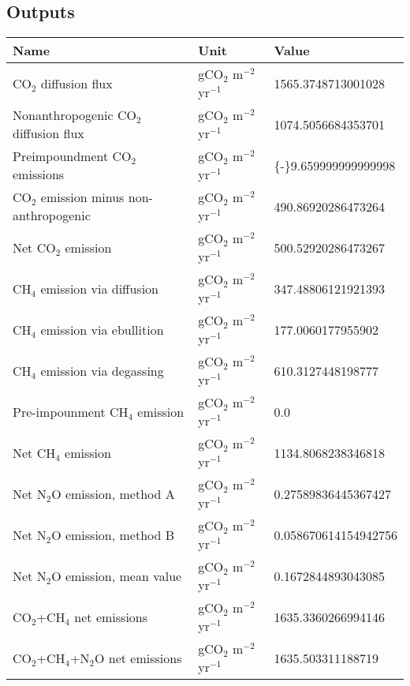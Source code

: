 \documentclass{article}%
\begin{document}
%
\subsection{Outputs}%
\label{subsec:Outputs}%
\begin{center}%
\renewcommand{\arraystretch}{1.0}%
\begin{tabu}{@{}p{10cm} X[c] X[l]@{}}%
\toprule%
\textbf{Name}&\textbf{Unit}&\textbf{Value}\\%
\midrule%
CO$_2$ diffusion flux&gCO$_2$ m$^{-2}$ yr$^{-1}$&\num[round-precision=4,round-mode=figures]{1565.3748713001028}\\%
Nonanthropogenic CO$_2$ diffusion flux&gCO$_2$ m$^{-2}$ yr$^{-1}$&\num[round-precision=4,round-mode=figures]{1074.5056684353701}\\%
Preimpoundment CO$_2$ emissions&gCO$_2$ m$^{-2}$ yr$^{-1}$&\num[round-precision=4,round-mode=figures]{{-}9.659999999999998}\\%
CO$_2$ emission minus non-anthropogenic&gCO$_2$ m$^{-2}$ yr$^{-1}$&\num[round-precision=4,round-mode=figures]{490.86920286473264}\\%
Net CO$_2$ emission&gCO$_2$ m$^{-2}$ yr$^{-1}$&\num[round-precision=4,round-mode=figures]{500.52920286473267}\\%
CH$_4$ emission via diffusion&gCO$_2$ m$^{-2}$ yr$^{-1}$&\num[round-precision=4,round-mode=figures]{347.48806121921393}\\%
CH$_4$ emission via ebullition&gCO$_2$ m$^{-2}$ yr$^{-1}$&\num[round-precision=4,round-mode=figures]{177.0060177955902}\\%
CH$_4$ emission via degassing&gCO$_2$ m$^{-2}$ yr$^{-1}$&\num[round-precision=4,round-mode=figures]{610.3127448198777}\\%
Pre-impounment CH$_4$ emission&gCO$_2$ m$^{-2}$ yr$^{-1}$&\num[round-precision=4,round-mode=figures]{0.0}\\%
Net CH$_4$ emission&gCO$_2$ m$^{-2}$ yr$^{-1}$&\num[round-precision=4,round-mode=figures]{1134.8068238346818}\\%
Net N$_2$O emission, method A&gCO$_2$ m$^{-2}$ yr$^{-1}$&\num[round-precision=4,round-mode=figures]{0.27589836445367427}\\%
Net N$_2$O emission, method B&gCO$_2$ m$^{-2}$ yr$^{-1}$&\num[round-precision=4,round-mode=figures]{0.058670614154942756}\\%
Net N$_2$O emission, mean value&gCO$_2$ m$^{-2}$ yr$^{-1}$&\num[round-precision=4,round-mode=figures]{0.1672844893043085}\\%
\midrule%
CO$_2$+CH$_4$ net emissions&gCO$_2$ m$^{-2}$ yr$^{-1}$&\num[round-precision=4,round-mode=figures]{1635.3360266994146}\\%
\midrule%
CO$_2$+CH$_4$+N$_2$O net emissions&gCO$_2$ m$^{-2}$ yr$^{-1}$&\num[round-precision=4,round-mode=figures]{1635.503311188719}\\\bottomrule%
%
\end{tabu}%
\end{center}%
\end{document}
